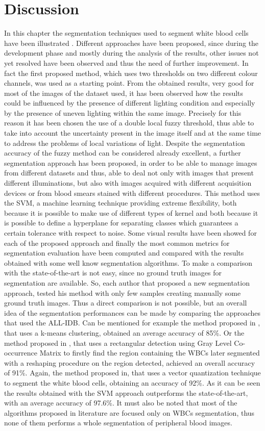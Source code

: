 \documentclass[final,a4paper,12pt,english]{UnicaPhdThesis3}
\begin{document}
\section{Discussion}\label{sec:Discussion}
In this chapter the segmentation techniques used to segment white blood cells have been illustrated . Different approaches have been proposed, since during the development phase and mostly during the analysis of the results, other issues not yet resolved have been observed and thus the need of further improvement. In fact the first proposed method, which uses two thresholds on two different colour channels, was used as a starting point. From the obtained results, very good for most of the images of the dataset used, it has been observed how the results could be influenced by the presence of different lighting condition and especially by the presence of uneven lighting within the same image. Precisely for this reason it has been chosen the use of a double local fuzzy threshold, thus able to take into account the uncertainty present in the image itself and at the same time to address the problems of local variations of light. Despite the segmentation accuracy of the fuzzy method can be considered already excellent, a further segmentation approach has been proposed, in order to be able to manage images from different datasets and thus, able to deal not only with images that present different illuminations, but also with images acquired with different acquisition devices or from blood smears stained with different procedures. This method uses the SVM, a machine learning technique providing extreme flexibility, both because it is possible to make use of different types of kernel and both because it is possible to define a hyperplane for separating classes which guarantees a certain tolerance with respect to noise. Some visual results have been showed for each of the proposed approach and finally the most common metrics for segmentation evaluation have been computed and compared with the results obtained with some well know segmentation algorithms. To make a comparison with the state-of-the-art is not easy, since no ground truth images for segmentation are available. So, each author that proposed a new segmentation approach, tested his method with only few samples creating manually some ground truth images. Thus a direct comparison is not possible, but an overall idea of the segmentation performances can be made by comparing the approaches that used the ALL-IDB. Can be mentioned for example the method proposed in \cite{Rawat}, that uses a k-means clustering, obtained an average accuracy of 85\%. Or the method proposed in \cite{Alilou}, that uses a rectangular detection using Gray Level Co-occurrence Matrix to firstly find the region containing the WBCs later segmented with a reshaping procedure on the region detected, achieved an overall accuracy of 91\%. Again, the method proposed in\cite{Kekre}, that uses a vector quantization technique to segment the white blood cells, obtaining an accuracy of 92\%. As it can be seen the results obtained with the SVM approach outperforms the state-of-the-art, with an average accuracy of 97.6\%. It must also be noted that most of the algorithms proposed in literature are focused only on WBCs segmentation, thus none of them performs a whole segmentation of peripheral blood images.
\end{document}
